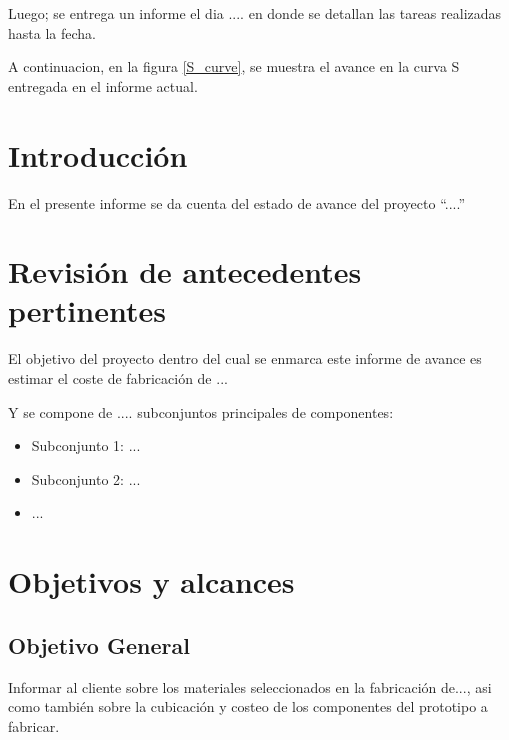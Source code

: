 \documentclass[12pt]{article}
\begin{document}
\qquad Luego; se entrega un informe el dia .... en donde se detallan las tareas realizadas hasta la fecha.

\qquad A continuacion, en la figura \ref{S_curve}, se muestra el avance en la curva S entregada en el informe actual.



\newpage

\section{Introducción}

\qquad En el presente informe se da cuenta del estado de avance del proyecto ``....''

\newpage
\section{Revisión de antecedentes pertinentes}

\qquad El objetivo del proyecto dentro del cual se enmarca este informe de avance es estimar el coste de fabricación de ...



\qquad Y se compone de .... subconjuntos principales de componentes:
\begin{itemize}
\item Subconjunto 1: ...
\item Subconjunto 2: ...
\item ...
\end{itemize}





\newpage
\section{Objetivos y alcances}
\subsection{Objetivo General}

\qquad Informar al cliente sobre los materiales seleccionados en la fabricación de..., asi como también sobre la cubicación y costeo de los componentes del prototipo a fabricar.
\end{document}
